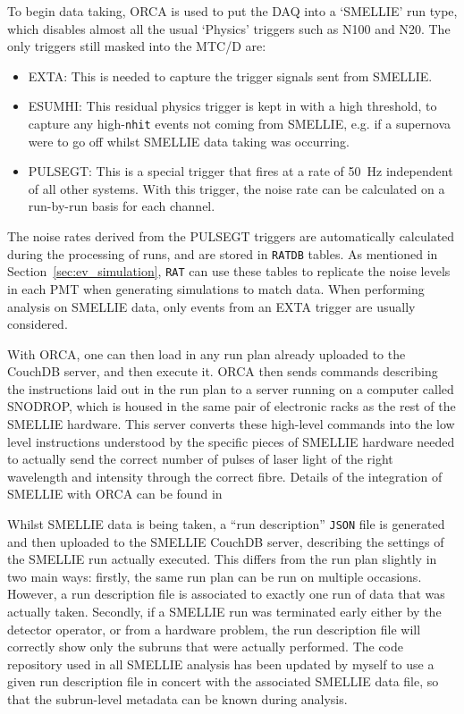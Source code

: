 To begin data taking, ORCA is used to put the DAQ into a `SMELLIE' run type, which disables almost all the usual `Physics' triggers such as N100 and N20. The only triggers still masked into the MTC/D are:
\begin{itemize}
    \item EXTA: This is needed to capture the trigger signals sent from SMELLIE.
    \item ESUMHI: This residual physics trigger is kept in with a high threshold, to capture any high-\texttt{nhit} events not coming from SMELLIE, e.g. if a supernova were to go off whilst SMELLIE data taking was occurring.
    \item PULSEGT: This is a special trigger that fires at a rate of \SI{50}{\Hz} independent of all other systems. With this trigger, the noise rate can be calculated on a run-by-run basis for each channel.
\end{itemize}
The noise rates derived from the PULSEGT triggers are automatically calculated during the processing of runs, and are stored in \texttt{RATDB} tables. As mentioned in Section~\ref{sec:ev_simulation}, \texttt{RAT} can use these tables to replicate the noise levels in each PMT when generating simulations to match data. When performing analysis on SMELLIE data, only events from an EXTA trigger are usually considered.

With ORCA, one can then load in any run plan already uploaded to the CouchDB server, and then execute it. ORCA then sends commands describing the instructions laid out in the run plan to a server running on a computer called SNODROP, which is housed in the same pair of electronic racks as the rest of the SMELLIE hardware. This server converts these high-level commands into the low level instructions understood by the specific pieces of SMELLIE hardware needed to actually send the correct number of pulses of laser light of the right wavelength and intensity through the correct fibre. Details of the integration of SMELLIE with ORCA can be found in~\cite{jonesFutureSearchesRare2016}

Whilst SMELLIE data is being taken, a ``run description'' \texttt{JSON} file is generated and then uploaded to the SMELLIE CouchDB server, describing the settings of the SMELLIE run actually executed. This differs from the run plan slightly in two main ways: firstly, the same run plan can be run on multiple occasions. However, a run description file is associated to exactly one run of data that was actually taken. Secondly, if a SMELLIE run was terminated early either by the detector operator, or from a hardware problem, the run description file will correctly show only the subruns that were actually performed. The code repository used in all SMELLIE analysis has been updated by myself to use a given run description file in concert with the associated SMELLIE data file, so that the subrun-level metadata can be known during analysis.


